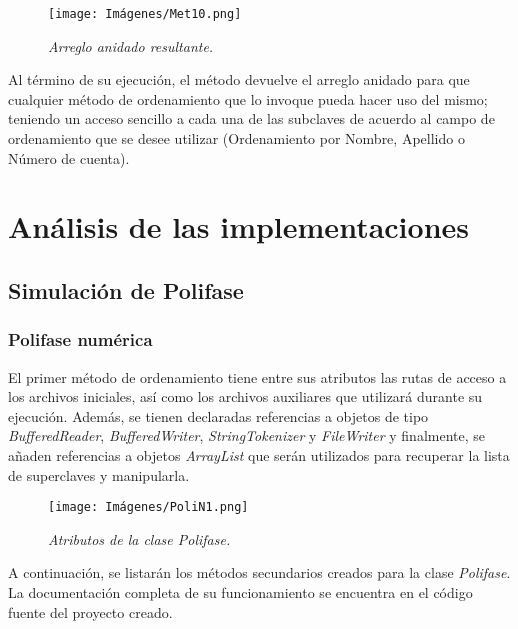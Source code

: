 \documentclass[letterpaper,12pt]{extarticle}
\begin{document}
\begin{figure}[h!]
\centering
\texttt{[image: Imágenes/Met10.png]}
\caption{\textit{Arreglo anidado resultante.}}
\label{fig:Met10}
\end{figure}

Al término de su ejecución, el método devuelve el arreglo anidado para que cualquier método de ordenamiento que lo invoque pueda hacer uso del mismo; teniendo un acceso sencillo a cada una de las subclaves de acuerdo al campo de ordenamiento que se desee utilizar (Ordenamiento por Nombre, Apellido o Número de cuenta).  


\section{Análisis de las implementaciones}

\subsection{Simulación de Polifase}

\subsubsection{Polifase numérica}

\noindent El primer método de ordenamiento tiene entre sus atributos las rutas de acceso a los archivos iniciales, así como los archivos auxiliares que utilizará durante su ejecución. Además, se tienen declaradas referencias a objetos de tipo \textit{BufferedReader}, \textit{BufferedWriter}, \textit{StringTokenizer} y \textit{FileWriter} y finalmente, se añaden referencias a objetos \textit{ArrayList} que serán utilizados para recuperar la lista de superclaves y manipularla.

\begin{figure}[h!]
\centering
\texttt{[image: Imágenes/PoliN1.png]}
\caption{\textit{Atributos de la clase Polifase.}}
\label{fig:PoliN1}
\end{figure}

\pagebreak

A continuación, se listarán los métodos secundarios creados para la clase \textit{Polifase}. La documentación completa de su funcionamiento se encuentra en el código fuente del proyecto creado. 
\end{document}
